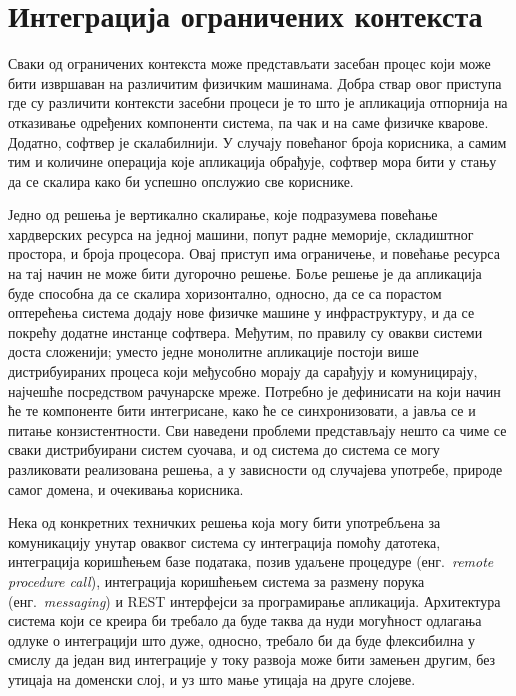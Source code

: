 \documentclass[12pt,oneside]{memoir}
\begin{document}
\section{Интеграција ограничених контекста}\label{integracijaogranicenihkonteksta}
Сваки од ограничених контекста може представљати засебан процес који може бити извршаван на различитим физичким машинама. Добра ствар овог приступа где су различити контексти засебни процеси је то што је апликација отпорнија на отказивање одређених компоненти система, па чак и на саме физичке кварове. Додатно, софтвер је скалабилнији. У случају повећаног броја корисника, а самим тим и количине операција које апликација обрађује, софтвер мора бити у стању да се скалира како би успешно опслужио све кориснике.

Једно од решења је вертикално скалирање, које подразумева повећање хардверских ресурса на једној машини, попут радне меморије, складиштног простора, и броја процесора. Овај приступ има ограничење, и повећање ресурса на тај начин не може бити дугорочно решење. Боље решење је да апликација буде способна да се скалира хоризонтално, односно, да се са порастом оптерећења система додају нове физичке машине у инфраструктуру, и да се покрећу додатне инстанце софтвера. Међутим, по правилу су овакви системи доста сложенији; уместо једне монолитне апликације постоји више дистрибуираних процеса који међусобно морају да сарађују и комуницирају, најчешће посредством рачунарске мреже. Потребно је дефинисати на који начин ће те компоненте бити интегрисане, како ће се синхронизовати, а јавља се и питање конзистентности. Сви наведени проблеми представљају нешто са чиме се сваки дистрибуирани систем суочава, и од система до система се могу разликовати реализована решења, а у зависности од случајева употребе, природе самог домена, и очекивања корисника.

Нека од конкретних техничких решења која могу бити употребљена за комуникацију унутар оваквог система су интеграција помоћу датотека, интеграција коришћењем базе података,  позив удаљене процедуре (енг.~\textit{remote procedure call}), интеграција коришћењем система за размену порука (енг.~\textit{messaging}) и REST интерфејси за програмирање апликација. Архитектура система који се креира би требало да буде таква да нуди могућност одлагања одлуке о интеграцији што дуже, односно, требало би да буде флексибилна у смислу да један вид интеграције у току развоја може бити замењен другим, без утицаја на доменски слој, и уз што мање утицаја на друге слојеве.
\end{document}
